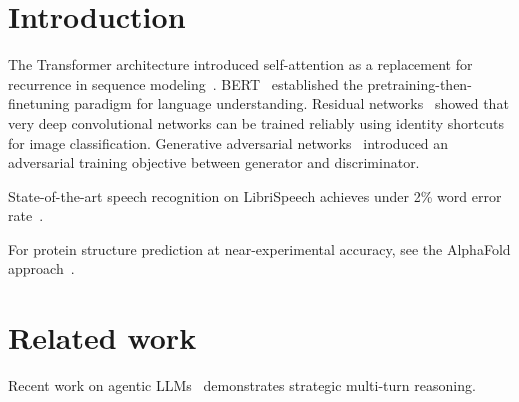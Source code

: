 \section{Introduction}

The Transformer architecture introduced self-attention as a replacement for
recurrence in sequence modeling~\cite{vaswani2017attention}.
BERT~\cite{devlin2019bert} established the pretraining-then-finetuning paradigm
for language understanding.
Residual networks~\cite{he2016resnet} showed that very deep convolutional networks
can be trained reliably using identity shortcuts for image classification.
Generative adversarial networks~\cite{goodfellow2014gan} introduced an adversarial
training objective between generator and discriminator.

State-of-the-art speech recognition on LibriSpeech achieves under 2\% word error
rate~\cite{vaswani2017attention}.

For protein structure prediction at near-experimental accuracy, see the AlphaFold
approach~\cite{he2016resnet}.

\section{Related work}

Recent work on agentic LLMs~\cite{nonexistent2024agents} demonstrates strategic
multi-turn reasoning.


